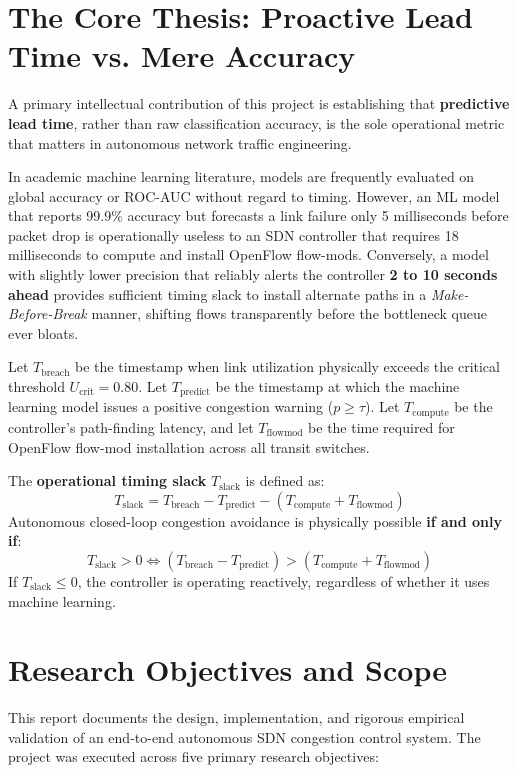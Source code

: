 \section{The Core Thesis: Proactive Lead Time vs. Mere Accuracy}
A primary intellectual contribution of this project is establishing that \textbf{predictive lead time}, rather than raw classification accuracy, is the sole operational metric that matters in autonomous network traffic engineering.

In academic machine learning literature, models are frequently evaluated on global accuracy or ROC-AUC without regard to timing. However, an ML model that reports 99.9\% accuracy but forecasts a link failure only 5 milliseconds before packet drop is operationally useless to an SDN controller that requires 18 milliseconds to compute and install OpenFlow flow-mods. Conversely, a model with slightly lower precision that reliably alerts the controller \textbf{2 to 10 seconds ahead} provides sufficient timing slack to install alternate paths in a \textit{Make-Before-Break} manner, shifting flows transparently before the bottleneck queue ever bloats.

\begin{formulabox}
Let $T_{\text{breach}}$ be the timestamp when link utilization physically exceeds the critical threshold $U_{\text{crit}} = 0.80$. Let $T_{\text{predict}}$ be the timestamp at which the machine learning model issues a positive congestion warning ($p \ge \tau$). Let $T_{\text{compute}}$ be the controller's path-finding latency, and let $T_{\text{flowmod}}$ be the time required for OpenFlow flow-mod installation across all transit switches. 

The \textbf{operational timing slack} $T_{\text{slack}}$ is defined as:
\begin{equation}
  T_{\text{slack}} = T_{\text{breach}} - T_{\text{predict}} - (T_{\text{compute}} + T_{\text{flowmod}})
\end{equation}
Autonomous closed-loop congestion avoidance is physically possible \textbf{if and only if}:
\begin{equation}
  T_{\text{slack}} > 0 \iff (T_{\text{breach}} - T_{\text{predict}}) > (T_{\text{compute}} + T_{\text{flowmod}})
\end{equation}
If $T_{\text{slack}} \le 0$, the controller is operating reactively, regardless of whether it uses machine learning.
\end{formulabox}

\section{Research Objectives and Scope}
This report documents the design, implementation, and rigorous empirical validation of an end-to-end autonomous SDN congestion control system. The project was executed across five primary research objectives:

